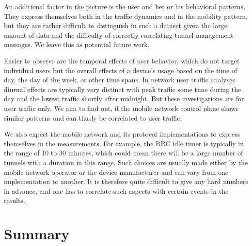 An additional factor in the picture is the user and her or his behavioral patterns. They express themselves both in the traffic dynamics and in the mobility pattern, but they are rather difficult to distinguish in such a dataset given the large amount of data and the difficulty of correctly correlating tunnel management messages. We leave this as potential future work.

Easier to observe are the temporal effects of user behavior, which do not target individual users but the overall effects of a device's usage based on the time of day, the day of the week, or other time spans. In network user traffic analyses diurnal effects are typically very distinct with peak traffic some time during the day and the lowest traffic shortly after midnight. But these investigations are for user traffic only. We aim to find out, if the mobile network control plane shows similar patterns and can thusly be correlated to user traffic.

We also expect the mobile network and its protocol implementations to express themselves in the measurements. For example, the \gls{RRC} idle timer is typically in the range of 10 to 30 minutes, which could mean there will be a large number of tunnels with a duration in this range. Such choices are usually made either by the mobile network operator or the device manufacturer and can vary from one implementation to another. It is therefore quite difficult to give any hard numbers in advance, and one has to correlate such aspects with certain events in the results.

















\section{Summary}
\label{c4:sec:conclusion}


